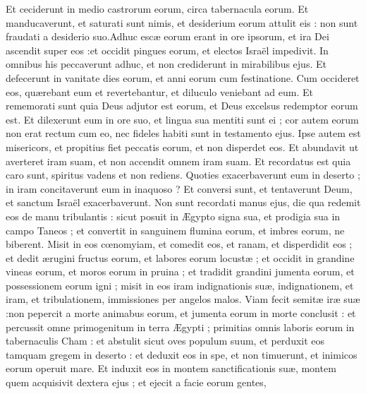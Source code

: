 {\VERSE Et ceciderunt in medio castrorum eorum, circa tabernacula eorum. \EVERSE
\VERSE Et manducaverunt,  et saturati sunt nimis, et desiderium eorum attulit eis : \EVERSE
\VERSE non sunt fraudati a desiderio suo.Adhuc escæ eorum erant in ore ipsorum,  \EVERSE
\VERSE et ira Dei ascendit super eos :et occidit pingues eorum, 
et electos Israël impedivit. \EVERSE
\VERSE In omnibus his peccaverunt adhuc, et non crediderunt in mirabilibus ejus. \EVERSE
\VERSE Et defecerunt in vanitate dies eorum, et anni eorum cum festinatione. \EVERSE
\VERSE Cum occideret eos,  quærebant eum et revertebantur, et diluculo veniebant ad eum. \EVERSE
\VERSE Et rememorati sunt quia Deus adjutor est eorum, et Deus excelsus redemptor eorum est. \EVERSE
\VERSE Et dilexerunt eum in ore suo, et lingua sua mentiti sunt ei ;  \EVERSE
\VERSE cor autem eorum non erat rectum cum eo, nec fideles habiti sunt in testamento ejus. \EVERSE
\VERSE Ipse autem est misericors, et propitius fiet peccatis eorum, 
et non disperdet eos.
Et abundavit ut averteret iram suam, 
et non accendit omnem iram suam. \EVERSE
\VERSE Et recordatus est quia caro sunt, spiritus vadens et non rediens. \EVERSE
\VERSE Quoties exacerbaverunt eum in deserto ; in iram concitaverunt eum in inaquoso ? \EVERSE
\VERSE Et conversi sunt,  et tentaverunt Deum, et sanctum Israël exacerbaverunt. \EVERSE
\VERSE Non sunt recordati manus ejus, die qua redemit eos de manu tribulantis : \EVERSE
\VERSE sicut posuit in Ægypto signa sua, et prodigia sua in campo Taneos ;  \EVERSE
\VERSE et convertit in sanguinem flumina eorum, et imbres eorum,  ne biberent. \EVERSE
\VERSE Misit in eos cœnomyiam,  et comedit eos, et ranam,  et disperdidit eos ;  \EVERSE
\VERSE et dedit ærugini fructus eorum, et labores eorum locustæ ;  \EVERSE
\VERSE et occidit in grandine vineas eorum, et moros eorum in pruina ;  \EVERSE
\VERSE et tradidit grandini jumenta eorum, et possessionem eorum igni ;  \EVERSE
\VERSE misit in eos iram indignationis suæ, indignationem,  et iram,  et tribulationem, 
immissiones per angelos malos. \EVERSE
\VERSE Viam fecit semitæ iræ suæ :non pepercit a morte animabus eorum, 
et jumenta eorum in morte conclusit : \EVERSE
\VERSE et percussit omne primogenitum in terra Ægypti ; primitias omnis laboris eorum in tabernaculis Cham : \EVERSE
\VERSE et abstulit sicut oves populum suum, et perduxit eos tamquam gregem in deserto : \EVERSE
\VERSE et deduxit eos in spe,  et non timuerunt, et inimicos eorum operuit mare. \EVERSE
\VERSE Et induxit eos in montem sanctificationis suæ, montem quem acquisivit dextera ejus ; 
et ejecit a facie eorum gentes, 
}
